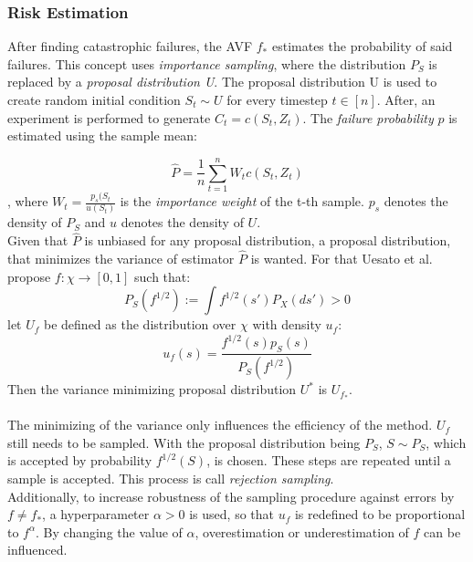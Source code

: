 \subsubsection{Risk Estimation}
\label{risk}

After finding catastrophic failures, the AVF $f_*$ estimates the probability of said failures. This concept uses \textit{importance sampling}, where the distribution $P_S$ is replaced by a \textit{proposal distribution U}. The proposal distribution U is used to create random initial condition $S_t \sim U$ for every timestep $t \in [n]$. After, an experiment is performed to generate $C_t = c(S_t, Z_t)$.
The \textit{failure probability} $p$ is estimated using the sample mean:

\begin{equation}
\hat{P} = \frac{1}{n} \sum_{t=1}^n W_t c(S_t, Z_t)
\end{equation}
, where $W_t = \frac{p_s(S_t}{u(S_t)}$ is the \textit{importance weight} of the t-th sample. $p_s$ denotes the density of $P_S$ and $u$ denotes the density of $U$.\\
Given that $\hat{P}$ is unbiased for any proposal distribution, a proposal distribution, that minimizes the variance of estimator $\hat{P}$ is wanted. For that Uesato et al. propose $f:\chi \rightarrow [0,1]$ such that:
\begin{equation}
P_S(f^{1/2}) := \int f^{1/2}(s')P_X(ds') > 0
\end{equation}
let $U_f$ be defined as the distribution over $\chi$ with density $u_f$: 
\begin{equation}
u_f(s) = \frac{f^{1/2}(s)p_S(s)}{P_S(f^{1/2})}
\end{equation}
Then the variance minimizing proposal distribution $U^*$ is $U_f_*$.\\\\
The minimizing of the variance only influences the efficiency of the method. $U_f$ still needs to be sampled. With the proposal distribution being $P_S$,  $S \sim P_S$, which is accepted by probability $f^{1/2}(S)$, is chosen. These steps are repeated until a sample is accepted. This process is call \textit{rejection sampling}.\\
Additionally, to increase robustness of the sampling procedure against errors by $f \neq f_*$, a hyperparameter $\alpha > 0$ is used, so that $u_f$ is redefined to be proportional to $f^\alpha$. By changing the value of $\alpha$, overestimation or underestimation of $f$ can be influenced.

